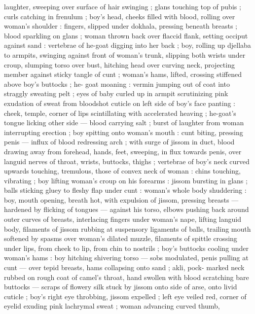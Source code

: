 {laughter, sweeping over surface of hair swinging ; glans touching top 
of pubis ; curls catching in frenulum ; boy's head, cheeks filled with 
blood, rolling over woman's shoulder : fingers, slipped under 
dokhala, pressing beneath breasts ; blood sparkling on glans ; 
woman thrown back over flaccid flank, setting occiput against sand : 
vertebrae of he-goat digging into her back ; boy, rolling up djellaba 
to armpits, swinging against front of woman's trunk, slipping both 
wrists under croup, slumping torso over bust, hitching head over 
curving neck, projecting member against sticky tangle of cunt ; 
woman's hams, lifted, crossing stiffened above boy's buttocks ; he- 
goat moaning : vermin jumping out of coat into straggly sweating 
pelt ; eyes of baby curled up in armpit scrutinizing pink exudation of 
sweat from bloodshot cuticle on left side of boy's face panting : 
cheek, temple, corner of lips scintillating with accelerated heaving ; 
he-goat's tongue licking other side --- blood carrying salt ; burst of 
laughter from woman interrupting erection ; boy spitting onto 
woman's mouth : cunt biting, pressing penis --- influx of blood 
redressing arch ; with surge of jissom in duct, blood drawing away 
from forehead, hands, feet, sweeping, in flux towards penis, over 
languid nerves of throat, wrists, buttocks, thighs ; vertebrae of boy's 
neck curved upwards touching, tremulous, those of convex neck of 
woman : chins touching, vibrating ; boy lifting woman's croup on his 
forearms : jissom bursting in glans ; balls sticking gluey to fleshy flap 
under cunt : woman's whole body shuddering : boy, mouth opening, 
breath hot, with expulsion of jissom, pressing breasts --- hardened 
by flicking of tongues --- against his torso, elbows pushing back 
around outer curves of breasts, interlacing fingers under woman's 
nape, lifting languid body, filaments of jissom rubbing at suspensory 
ligaments of balls, trailing mouth softened by spasms over woman's 
dilated muzzle, filaments of spittle crossing under lips, from cheek to 
lip, from chin to nostrils ; boy's buttocks cooling under woman's 
hams : boy hitching shivering torso --- sobs modulated, penis pulling 
at cunt --- over tepid breasts, hams collapsing onto sand ; akli, pock- 
marked neck rubbed on rough coat of camel's throat, hand swollen 
with blood scratching bare buttocks --- scraps of flowery silk stuck 
by jissom onto side of arse, onto livid cuticle ; boy's right eye 
throbbing, jissom expelled ; left eye veiled red, corner of eyelid 
exuding pink lachrymal sweat ; woman advancing curved thumb, 
}
